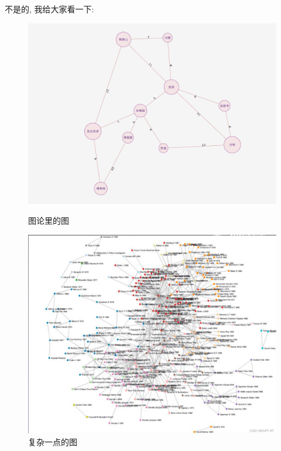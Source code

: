 不是的, 我给大家看一下: 

\begin{figure}[ht]
  \centering
  \begin{minipage}[h]{0.45\textwidth}
    \includegraphics[width=\textwidth]{asset/54c020ae-39d8-4359-8f66-0d79cdcfc083.png}
    \caption{图论里的图}
    \label{fig:img6_2}
  \end{minipage}
  \hspace{1em}
  \begin{minipage}[h]{0.45\textwidth}
    \includegraphics[width=\textwidth]{asset/2d108889-bf01-45ae-ae0c-19a3daa5a757.png}
    \caption{复杂一点的图}
    \label{fig:img6_3}
  \end{minipage}
\end{figure}

